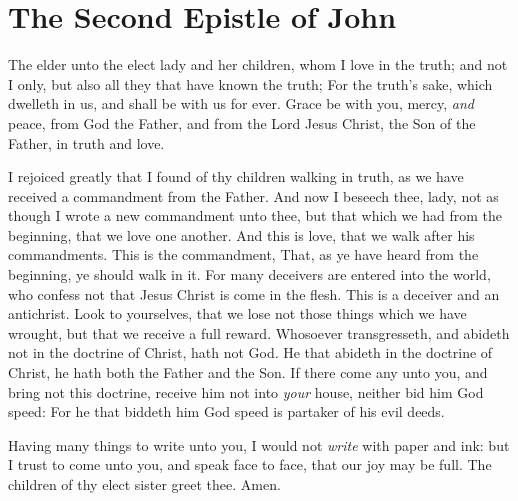 \documentclass[11pt,letterpaper,oneside]{memoir}
\begin{document}
\chapter[2 John]{The Second Epistle of John}

The elder unto the elect lady and her children, whom I love in the
truth; and not I only, but also all they that have known the truth;
For the truth's sake, which dwelleth in us, and shall be with us for
ever.  Grace be with you, mercy, \emph{and} peace, from God the
Father, and from the Lord Jesus Christ, the Son of the Father, in
truth and love.

I rejoiced greatly that I found of thy children walking in truth, as
we have received a commandment from the Father.  And now I beseech
thee, lady, not as though I wrote a new commandment unto thee, but
that which we had from the beginning, that we love one another.  And
this is love, that we walk after his commandments. This is the
commandment, That, as ye have heard from the beginning, ye should walk
in it.  For many deceivers are entered into the world, who confess not
that Jesus Christ is come in the flesh. This is a deceiver and an
antichrist.  Look to yourselves, that we lose not those things which
we have wrought, but that we receive a full reward.  Whosoever
transgresseth, and abideth not in the doctrine of Christ, hath not
God. He that abideth in the doctrine of Christ, he hath both the
Father and the Son.  If there come any unto you, and bring not this
doctrine, receive him not into \emph{your} house, neither bid him God
speed:  For he that biddeth him God speed is partaker of his evil
deeds.

Having many things to write unto you, I would not \emph{write} with
paper and ink: but I trust to come unto you, and speak face to face,
that our joy may be full.  The children of thy elect sister greet
thee. Amen.
\end{document}
